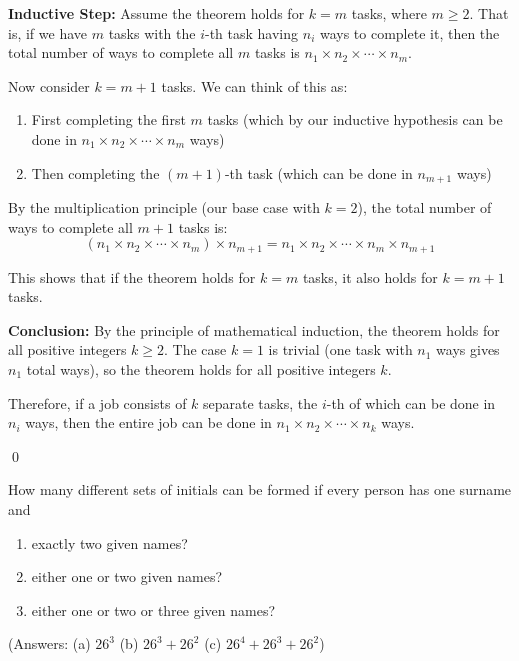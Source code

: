 \textbf{Inductive Step:}
Assume the theorem holds for $k = m$ tasks, where $m \geq 2$. That is, if we have $m$ tasks with the $i$-th task having $n_i$ ways to complete it, then the total number of ways to complete all $m$ tasks is $n_1 \times n_2 \times \cdots \times n_m$.

Now consider $k = m + 1$ tasks. We can think of this as:
\begin{enumerate}
\item First completing the first $m$ tasks (which by our inductive hypothesis can be done in $n_1 \times n_2 \times \cdots \times n_m$ ways)
\item Then completing the $(m+1)$-th task (which can be done in $n_{m+1}$ ways)
\end{enumerate}

By the multiplication principle (our base case with $k=2$), the total number of ways to complete all $m+1$ tasks is:
\[(n_1 \times n_2 \times \cdots \times n_m) \times n_{m+1} = n_1 \times n_2 \times \cdots \times n_m \times n_{m+1}\]

This shows that if the theorem holds for $k = m$ tasks, it also holds for $k = m + 1$ tasks.

\textbf{Conclusion:}
By the principle of mathematical induction, the theorem holds for all positive integers $k \geq 2$. The case $k = 1$ is trivial (one task with $n_1$ ways gives $n_1$ total ways), so the theorem holds for all positive integers $k$.

Therefore, if a job consists of $k$ separate tasks, the $i$-th of which can be done in $n_i$ ways, then the entire job can be done in $n_1 \times n_2 \times \cdots \times n_k$ ways.



\qed
\begin{problembox}
How many different sets of initials can be formed if every person has one surname and
\begin{enumerate}[label=(\alph*)]
    \item exactly two given names?
    \item either one or two given names?
    \item either one or two or three given names?
\end{enumerate}
(Answers: (a) $26^3$ (b) $26^3 + 26^2$ (c) $26^4 + 26^3 + 26^2$)
\end{problembox}

